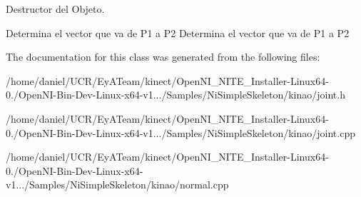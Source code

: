 Destructor del Objeto. 

Determina el vector que va de P1 a P2 Determina el vector que va de P1 a P2 

The documentation for this class was generated from the following files\-:\begin{DoxyCompactItemize}
\item 
/home/daniel/\-U\-C\-R/\-Ey\-A\-Team/kinect/\-Open\-N\-I\-\_\-\-N\-I\-T\-E\-\_\-\-Installer-\/\-Linux64-\/0./\-Open\-N\-I-\/\-Bin-\/\-Dev-\/\-Linux-\/x64-\/v1.../\-Samples/\-Ni\-Simple\-Skeleton/kinao/joint.\-h\item 
/home/daniel/\-U\-C\-R/\-Ey\-A\-Team/kinect/\-Open\-N\-I\-\_\-\-N\-I\-T\-E\-\_\-\-Installer-\/\-Linux64-\/0./\-Open\-N\-I-\/\-Bin-\/\-Dev-\/\-Linux-\/x64-\/v1.../\-Samples/\-Ni\-Simple\-Skeleton/kinao/joint.\-cpp\item 
/home/daniel/\-U\-C\-R/\-Ey\-A\-Team/kinect/\-Open\-N\-I\-\_\-\-N\-I\-T\-E\-\_\-\-Installer-\/\-Linux64-\/0./\-Open\-N\-I-\/\-Bin-\/\-Dev-\/\-Linux-\/x64-\/v1.../\-Samples/\-Ni\-Simple\-Skeleton/kinao/normal.\-cpp\end{DoxyCompactItemize}
